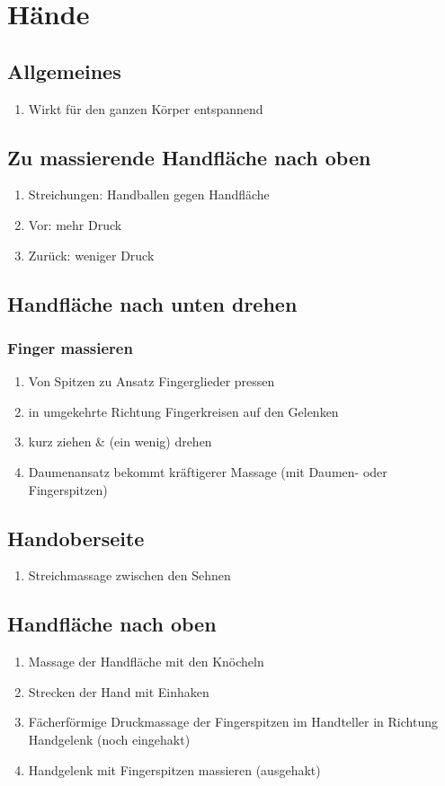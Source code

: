 \section{Hände}

\subsection{Allgemeines}
\begin{enumerate}
\item Wirkt für den ganzen Körper entspannend
\end{enumerate}

\subsection{Zu massierende Handfläche nach oben}
\begin{enumerate}
\item Streichungen: Handballen gegen Handfläche
\item Vor: mehr Druck
\item Zurück: weniger Druck
\end{enumerate}

\subsection{Handfläche nach unten drehen}

\subsubsection{Finger massieren}
\begin{enumerate}
\item Von Spitzen zu Ansatz Fingerglieder pressen
\item in umgekehrte Richtung Fingerkreisen auf den Gelenken
\item kurz ziehen \& (ein wenig) drehen
\item Daumenansatz bekommt kräftigerer Massage (mit Daumen- oder Fingerspitzen)
\end{enumerate}
\subsection{Handoberseite}
\begin{enumerate}
\item Streichmassage zwischen den Sehnen
\end{enumerate}
\subsection{Handfläche nach oben}
\begin{enumerate}
\item Massage der Handfläche mit den Knöcheln
\item Strecken der Hand mit Einhaken
\item Fächerförmige Druckmassage der Fingerspitzen im Handteller in Richtung Handgelenk (noch eingehakt)
\item Handgelenk mit Fingerspitzen massieren (ausgehakt)
\end{enumerate}

